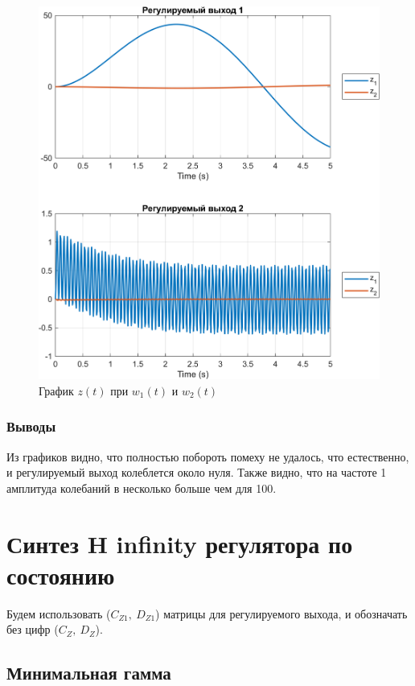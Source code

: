 \begin{figure}[H]
    \centering
    \includegraphics[width=1\linewidth]{figs/4_sim.png}
    \caption{График $z(t)$ при $w_1(t)$ и $w_2(t)$}
    \label{fig:4sim}
\end{figure}

\subsubsection{Выводы}

Из графиков видно, что полностью побороть помеху не удалось, что естественно, и регулируемый выход 
колеблется около нуля. Также видно, что на 
частоте 1 амплитуда колебаний  в несколько больше чем для 100.



\section{Синтез H infinity регулятора по состоянию}

Будем использовать ($C_{Z1},\ D_{Z1}$) матрицы для регулируемого выхода, и обозначать
без цифр ($C_{Z},\ D_{Z}$). 

\subsection{Минимальная гамма}

